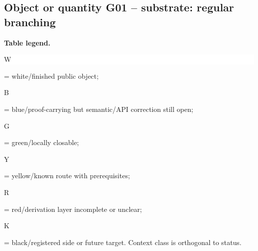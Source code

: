 \subsection*{Object or quantity G01 -- substrate: regular branching}
\hypertarget{objproof:G01}{}
\par\smallskip\noindent\begin{minipage}{0.99\linewidth}\footnotesize\raggedright\textbf{Table legend.} \colorbox{white}{\strut W} = white/finished public object; \colorbox{cyan!20}{\strut B} = blue/proof-carrying but semantic/API correction still open; \colorbox{green!18}{\strut G} = green/locally closable; \colorbox{yellow!25}{\strut Y} = yellow/known route with prerequisites; \colorbox{red!20}{\strut R} = red/derivation layer incomplete or unclear; \colorbox{black!18}{\strut K} = black/registered side or future target. Context class is orthogonal to status.\end{minipage}\par\vspace{0.25em}
